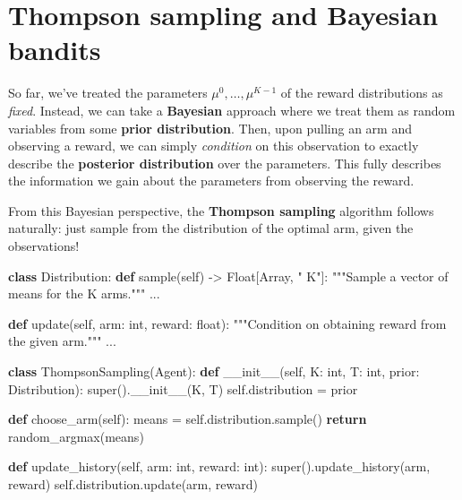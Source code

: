 \documentclass[
  letterpaper,
  DIV=11,
  numbers=noendperiod]{scrreprt}
\newenvironment{Shaded}{\begin{snugshade}}{\end{snugshade}}
\newcommand{\BuiltInTok}[1]{\textcolor[rgb]{0.00,0.23,0.31}{#1}}
\newcommand{\CommentTok}[1]{\textcolor[rgb]{0.37,0.37,0.37}{#1}}
\newcommand{\ControlFlowTok}[1]{\textcolor[rgb]{0.00,0.23,0.31}{\textbf{#1}}}
\newcommand{\FunctionTok}[1]{\textcolor[rgb]{0.28,0.35,0.67}{#1}}
\newcommand{\KeywordTok}[1]{\textcolor[rgb]{0.00,0.23,0.31}{\textbf{#1}}}
\newcommand{\NormalTok}[1]{\textcolor[rgb]{0.00,0.23,0.31}{#1}}
\newcommand{\OperatorTok}[1]{\textcolor[rgb]{0.37,0.37,0.37}{#1}}
\newcommand{\StringTok}[1]{\textcolor[rgb]{0.13,0.47,0.30}{#1}}
\newcommand{\VariableTok}[1]{\textcolor[rgb]{0.07,0.07,0.07}{#1}}
\theoremstyle{plain}
\theoremstyle{plain}
\theoremstyle{definition}
\theoremstyle{definition}
\theoremstyle{remark}
\begin{document}
\section{Thompson sampling and Bayesian
bandits}\label{sec-thompson_sampling}

So far, we've treated the parameters \(\mu^0, \dots, \mu^{K-1}\) of the
reward distributions as \emph{fixed}. Instead, we can take a
\textbf{Bayesian} approach where we treat them as random variables from
some \textbf{prior distribution}. Then, upon pulling an arm and
observing a reward, we can simply \emph{condition} on this observation
to exactly describe the \textbf{posterior distribution} over the
parameters. This fully describes the information we gain about the
parameters from observing the reward.

From this Bayesian perspective, the \textbf{Thompson sampling} algorithm
follows naturally: just sample from the distribution of the optimal arm,
given the observations!

\begin{Shaded}
\begin{Highlighting}[]
\KeywordTok{class}\NormalTok{ Distribution:}
    \KeywordTok{def}\NormalTok{ sample(}\VariableTok{self}\NormalTok{) }\OperatorTok{{-}\textgreater{}}\NormalTok{ Float[Array, }\StringTok{" K"}\NormalTok{]:}
        \CommentTok{"""Sample a vector of means for the K arms."""}
\NormalTok{        ...}

    \KeywordTok{def}\NormalTok{ update(}\VariableTok{self}\NormalTok{, arm: }\BuiltInTok{int}\NormalTok{, reward: }\BuiltInTok{float}\NormalTok{):}
        \CommentTok{"""Condition on obtaining \textasciigrave{}reward\textasciigrave{} from the given arm."""}
\NormalTok{        ...}
\end{Highlighting}
\end{Shaded}

\begin{Shaded}
\begin{Highlighting}[]
\KeywordTok{class}\NormalTok{ ThompsonSampling(Agent):}
    \KeywordTok{def} \FunctionTok{\_\_init\_\_}\NormalTok{(}\VariableTok{self}\NormalTok{, K: }\BuiltInTok{int}\NormalTok{, T: }\BuiltInTok{int}\NormalTok{, prior: Distribution):}
        \BuiltInTok{super}\NormalTok{().}\FunctionTok{\_\_init\_\_}\NormalTok{(K, T)}
        \VariableTok{self}\NormalTok{.distribution }\OperatorTok{=}\NormalTok{ prior}

    \KeywordTok{def}\NormalTok{ choose\_arm(}\VariableTok{self}\NormalTok{):}
\NormalTok{        means }\OperatorTok{=} \VariableTok{self}\NormalTok{.distribution.sample()}
        \ControlFlowTok{return}\NormalTok{ random\_argmax(means)}

    \KeywordTok{def}\NormalTok{ update\_history(}\VariableTok{self}\NormalTok{, arm: }\BuiltInTok{int}\NormalTok{, reward: }\BuiltInTok{int}\NormalTok{):}
        \BuiltInTok{super}\NormalTok{().update\_history(arm, reward)}
        \VariableTok{self}\NormalTok{.distribution.update(arm, reward)}
\end{Highlighting}
\end{Shaded}
\end{document}

